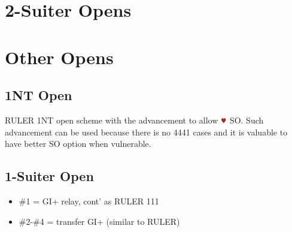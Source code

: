 \documentclass{article}
\begin{document}
\begin{multicols}{2}
\section{2-Suiter Opens}

\section{Other Opens}
\subsection{1NT Open}
RULER 1NT open scheme with the advancement to allow $\hhh$ SO. Such advancement can be used because there is no 4441 cases and it is valuable to have better SO option when vulnerable.

\subsection{1-Suiter Open}\label{sec:1suit}
\begin{itemize}
    \item \#1 = GI+ relay, cont' as RULER 111
    \item \#2-\#4 = transfer GI+ (similar to RULER)
\end{itemize}


\end{multicols}
\end{document}
